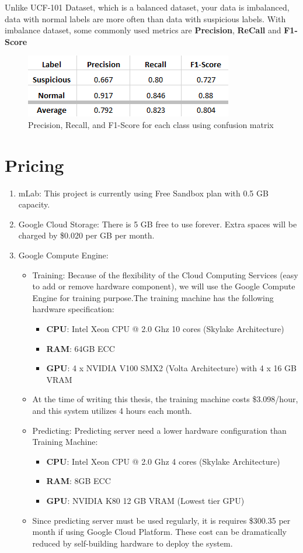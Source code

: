 Unlike UCF-101 Dataset, which is a balanced dataset, your data is imbalanced, data with normal labels are more often than data with suspicious labels. With imbalance dataset, some commonly used metrics are \textbf{Precision}, \textbf{ReCall} and \textbf{F1-Score}
\begin{figure}[H]
	\centering
	\includegraphics[width=0.7\columnwidth]{images/chap5/evaluate.png}
	\caption{Precision, Recall, and F1-Score for each class using confusion matrix}
\end{figure}

\section{Pricing}
\begin{enumerate}
	\item mLab: This project is currently using Free Sandbox plan with 0.5 GB capacity.
	\item Google Cloud Storage: There is 5 GB free to use forever. Extra spaces will be charged by \$0.020 per GB per month.
	\item Google Compute Engine:
		\begin{itemize}
			\item Training: Because of the flexibility of the Cloud Computing Services (easy to add or remove hardware component), we will use the Google Compute Engine for training purpose.The training machine has the following hardware specification:
			 \begin{itemize}
			 	\item \textbf{CPU}: Intel Xeon CPU @ 2.0 Ghz 10 cores (Skylake Architecture)
			 	\item \textbf{RAM}: 64GB ECC
			 	\item \textbf{GPU}: 4 x NVIDIA V100 SMX2 (Volta Architecture) with 4 x 16 GB VRAM
			 \end{itemize}
			 \item At the time of writing this thesis, the training machine costs \$3.098/hour, and this system utilizes 4 hours each month. 
			\item Predicting: Predicting server need a lower hardware configuration than Training Machine:
			\begin{itemize}
				\item \textbf{CPU}: Intel Xeon CPU @ 2.0 Ghz 4 cores (Skylake Architecture)
				\item \textbf{RAM}: 8GB ECC
				\item \textbf{GPU}: NVIDIA K80 12 GB VRAM (Lowest tier GPU)
			\end{itemize}
			\item Since predicting server must be used regularly, it is requires \$300.35 per month if using Google Cloud Platform. These cost can be dramatically reduced by self-building hardware to deploy the system.
		\end{itemize}
\end{enumerate}
